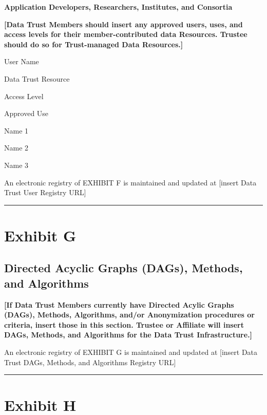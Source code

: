\documentclass[]{book}
\begin{document}
\textbf{Application Developers, Researchers, Institutes, and Consortia}

\textbf{{[}Data Trust Members should insert any approved users, uses, and access levels for their member-contributed data Resources. Trustee should do so for Trust-managed Data Resources.{]}}

User Name

Data Trust Resource

Access Level

Approved Use

Name 1

Name 2

Name 3

An electronic registry of EXHIBIT F is maintained and updated at {[}insert Data Trust User Registry URL{]}

\begin{center}\rule{0.5\linewidth}{0.5pt}\end{center}

\hypertarget{exhibit-g}{%
\chapter*{Exhibit G}\label{exhibit-g}}

\hypertarget{directed-acyclic-graphs-dags-methods-and-algorithms}{%
\section*{Directed Acyclic Graphs (DAGs), Methods, and Algorithms}\label{directed-acyclic-graphs-dags-methods-and-algorithms}}

\textbf{{[}If Data Trust Members currently have Directed Acylic Graphs (DAGs), Methods, Algorithms, and/or Anonymization procedures or criteria, insert those in this section. Trustee or Affiliate will insert DAGs, Methods, and Algorithms for the Data Trust Infrastructure.{]}}

An electronic registry of EXHIBIT G is maintained and updated at {[}insert Data Trust DAGs, Methods, and Algorithms Registry URL{]}

\begin{center}\rule{0.5\linewidth}{0.5pt}\end{center}

\hypertarget{exhibit-h}{%
\chapter*{Exhibit H}\label{exhibit-h}}
\end{document}
